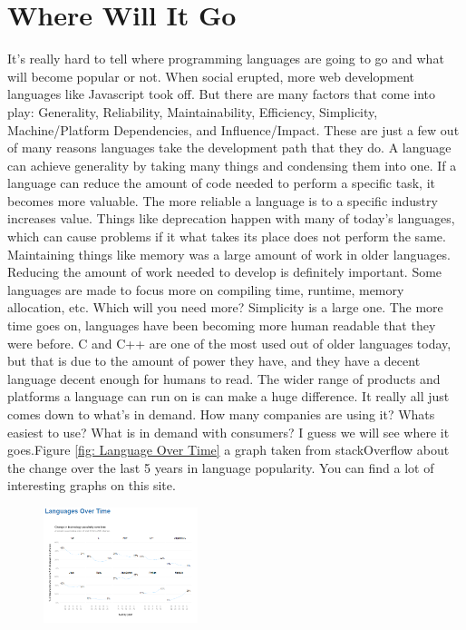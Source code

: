 \documentclass[letterpaper, 10 pt, conference]{IEEEtran}
\begin{document}
\section{Where Will It Go}
\indent It's really hard to tell where programming languages are going to go and what will become popular or not. When social erupted, more web development languages like Javascript took off. But there are many factors that come into play: Generality, Reliability, Maintainability, Efficiency, Simplicity, Machine/Platform Dependencies, and Influence/Impact. These are just a few out of many reasons languages take the development path that they do. A language can achieve generality by taking many things and condensing them into one. If a language can reduce the amount of code needed to perform a specific task, it becomes more valuable. The more reliable a language is to a specific industry increases value. Things like deprecation happen with many of today's languages, which can cause problems if it what takes its place does not perform the same. Maintaining things like memory was a large amount of work in older languages. Reducing the amount of work needed to develop is definitely important. Some languages are made to focus more on compiling time, runtime, memory allocation, etc. Which will you need more? Simplicity is a large one. The more time goes on, languages have been becoming more human readable that they were before. C and C++ are one of the most used out of older languages today, but that is due to the amount of power they have, and they have a decent language decent enough for humans to read. The wider range of products and platforms a language can run on is can make a huge difference. It really all just comes down to what's in demand. How many companies are using it? Whats easiest to use? What is in demand with consumers? I guess we will see where it goes.Figure \ref{fig: Language Over Time} a graph taken from stackOverflow about the change over the last 5 years in language popularity. You can find a lot of interesting graphs on this site. 
\begin{figure} [!ht]
\centering
\includegraphics[width=0.4\textwidth]{languageOverTime.png}
\caption{}
\label{fig:Language Over Time}
\end{figure}
\newline
\end{document}
